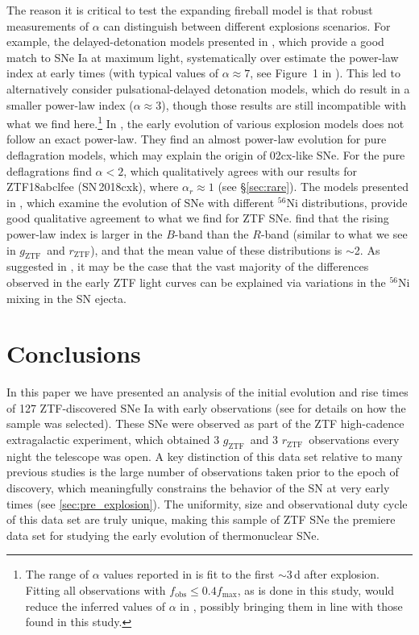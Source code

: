 \documentclass[twocolumn]{aastex63}
\newcommand{\rztf}{$r_\mathrm{ZTF}$}
\newcommand{\gztf}{$g_\mathrm{ZTF}$}
\begin{document}
The reason it is critical to test the expanding fireball model is that robust
measurements of $\alpha$ can distinguish between different explosions
scenarios. For example, the delayed-detonation models presented in
\citet{Blondin13}, which provide a good match to SNe Ia at maximum light,
systematically over estimate the power-law index at early times (with typical
values of $\alpha \approx 7$, see Figure~1 in \citealt{Dessart14}). This led
\citet{Dessart14} to alternatively consider pulsational-delayed detonation
models, which do result in a smaller power-law index ($\alpha \approx 3$),
though those results are still incompatible with what we find
here.\footnote{The range of $\alpha$ values reported in \citet{Dessart14} is
fit to the first $\sim$3\,d after explosion. Fitting all observations with
$f_\mathrm{obs} \leq 0.4 f_\mathrm{max}$, as is done in this study, would
reduce the inferred values of $\alpha$ in \citet{Dessart14}, possibly bringing
them in line with those found in this study.} In \citet{Noebauer17}, the early
evolution of various explosion models does not follow an exact power-law. They
find an almost power-law evolution for pure deflagration models, which may
explain the origin of 02cx-like SNe. For the pure deflagrations
\citet{Noebauer17} find $\alpha < 2$, which qualitatively agrees with our
results for ZTF18abclfee (SN\,2018cxk), where $\alpha_r \approx 1$ (see
\S\ref{sec:rare}). The models presented in \citet{Magee19}, which examine the
evolution of SNe with different $^{56}$Ni distributions, provide good
qualitative agreement to what we find for ZTF SNe. \citet{Magee19} find that
the rising power-law index is larger in the $B$-band than the $R$-band
(similar to what we see in \gztf\ and \rztf), and that the mean value of these
distributions is $\sim$2. As suggested in \citet{Magee19}, it may be the case
that the vast majority of the differences observed in the early ZTF light
curves can be explained via variations in the $^{56}$Ni mixing in the SN
ejecta.


\section{Conclusions}

In this paper we have presented an analysis of the initial evolution and rise
times of 127 ZTF-discovered SNe Ia with early observations (see
\citealt{Yao19} for details on how the sample was selected). These SNe were
observed as part of the ZTF high-cadence extragalactic experiment, which
obtained 3 \gztf\ and 3 \rztf\ observations every night the telescope was
open. A key distinction of this data set relative to many previous studies is
the large number of observations taken prior to the epoch of discovery, which
meaningfully constrains the behavior of the SN at very early times (see
\ref{sec:pre_explosion}). The uniformity, size and observational duty cycle of
this data set are truly unique, making this sample of ZTF SNe the premiere
data set for studying the early evolution of thermonuclear SNe.
\end{document}
